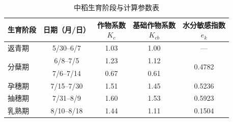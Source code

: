 \begin{table}[!htbp]
 \centering\small
 \caption{中稻生育阶段与计算参数表}
 \label{tab:ch2-calendar}
 \renewcommand{\arraystretch}{1.15}
 \begin{tabular}{lcccc}
 \toprule
 生育阶段 & 日期（月/日） & \shortstack{作物系数\\\(K_c\)} & \shortstack{基础作物系数\\\(K_{cb}\)} & \shortstack{水分敏感指数\\\(e_k\)}\\
 \midrule
 返青期 & 5/30--6/7 & 1.03 & 1.00 & ---\\
 \multirow{2}{*}{分蘖期} & 6/8--7/5 & 1.23 & 1.12 & \multirow{2}{*}{0.4782}\\
  & 7/6--7/14 & 0.67 & 0.61 & \\
 孕穗期 & 7/15--7/30 & 1.51 & 1.45 & 0.5236\\
 抽穗期 & 7/31--8/9 & 1.60 & 1.53 & 0.5923\\
 乳熟期 & 8/10--8/18 & 1.44 & 1.11 & 0.1504\\
 \bottomrule
 \end{tabular}
\end{table}
